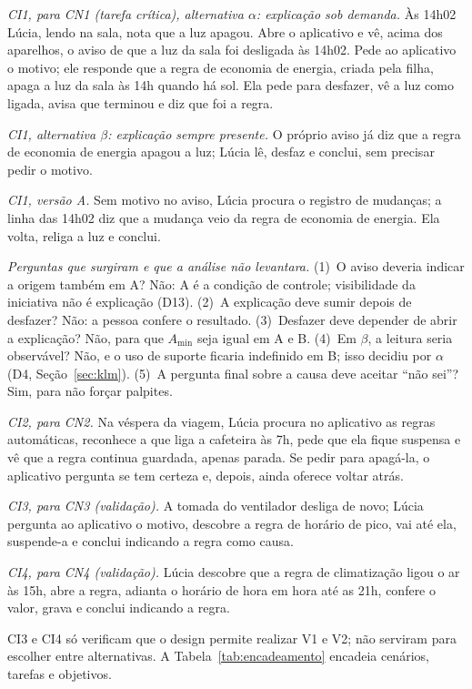 \documentclass[conference]{IEEEtran}
\begin{document}
\textit{CI1, para CN1 (tarefa crítica), alternativa $\alpha$: explicação sob demanda.} Às 14h02 Lúcia, lendo na sala, nota que a luz apagou. Abre o aplicativo e vê, acima dos aparelhos, o aviso de que a luz da sala foi desligada às 14h02. Pede ao aplicativo o motivo; ele responde que a regra de economia de energia, criada pela filha, apaga a luz da sala às 14h quando há sol. Ela pede para desfazer, vê a luz como ligada, avisa que terminou e diz que foi a regra.

\textit{CI1, alternativa $\beta$: explicação sempre presente.} O próprio aviso já diz que a regra de economia de energia apagou a luz; Lúcia lê, desfaz e conclui, sem precisar pedir o motivo.

\textit{CI1, versão A.} Sem motivo no aviso, Lúcia procura o registro de mudanças; a linha das 14h02 diz que a mudança veio da regra de economia de energia. Ela volta, religa a luz e conclui.

\textit{Perguntas que surgiram e que a análise não levantara.} (1)~O aviso deveria indicar a origem também em A? Não: A é a condição de controle; visibilidade da iniciativa não é explicação (D13). (2)~A explicação deve sumir depois de desfazer? Não: a pessoa confere o resultado. (3)~Desfazer deve depender de abrir a explicação? Não, para que $A_{\min}$ seja igual em A e B. (4)~Em $\beta$, a leitura seria observável? Não, e o uso de suporte ficaria indefinido em B; isso decidiu por $\alpha$ (D4, Seção~\ref{sec:klm}). (5)~A pergunta final sobre a causa deve aceitar ``não sei''? Sim, para não forçar palpites.

\textit{CI2, para CN2.} Na véspera da viagem, Lúcia procura no aplicativo as regras automáticas, reconhece a que liga a cafeteira às 7h, pede que ela fique suspensa e vê que a regra continua guardada, apenas parada. Se pedir para apagá-la, o aplicativo pergunta se tem certeza e, depois, ainda oferece voltar atrás.

\textit{CI3, para CN3 (validação).} A tomada do ventilador desliga de novo; Lúcia pergunta ao aplicativo o motivo, descobre a regra de horário de pico, vai até ela, suspende-a e conclui indicando a regra como causa.

\textit{CI4, para CN4 (validação).} Lúcia descobre que a regra de climatização ligou o ar às 15h, abre a regra, adianta o horário de hora em hora até as 21h, confere o valor, grava e conclui indicando a regra.

CI3 e CI4 só verificam que o design permite realizar V1 e V2; não serviram para escolher entre alternativas. A Tabela~\ref{tab:encadeamento} encadeia cenários, tarefas e objetivos.
\end{document}
